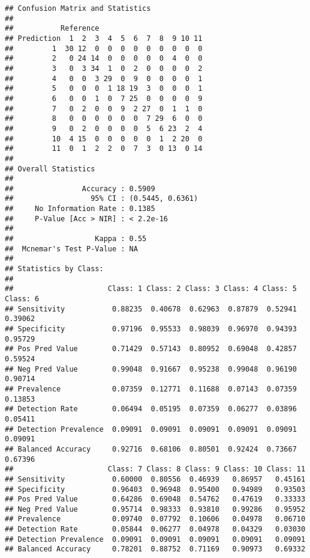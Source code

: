\documentclass[]{article}
\newenvironment{Shaded}{\begin{snugshade}}{\end{snugshade}}
\newcommand{\KeywordTok}[1]{\textcolor[rgb]{0.13,0.29,0.53}{\textbf{#1}}}
\newcommand{\DataTypeTok}[1]{\textcolor[rgb]{0.13,0.29,0.53}{#1}}
\newcommand{\CommentTok}[1]{\textcolor[rgb]{0.56,0.35,0.01}{\textit{#1}}}
\newcommand{\OtherTok}[1]{\textcolor[rgb]{0.56,0.35,0.01}{#1}}
\newcommand{\OperatorTok}[1]{\textcolor[rgb]{0.81,0.36,0.00}{\textbf{#1}}}
\newcommand{\NormalTok}[1]{#1}
\begin{document}
\begin{verbatim}
## Confusion Matrix and Statistics
## 
##           Reference
## Prediction  1  2  3  4  5  6  7  8  9 10 11
##         1  30 12  0  0  0  0  0  0  0  0  0
##         2   0 24 14  0  0  0  0  0  4  0  0
##         3   0  3 34  1  0  2  0  0  0  0  2
##         4   0  0  3 29  0  9  0  0  0  0  1
##         5   0  0  0  1 18 19  3  0  0  0  1
##         6   0  0  1  0  7 25  0  0  0  0  9
##         7   0  2  0  0  9  2 27  0  1  1  0
##         8   0  0  0  0  0  0  7 29  6  0  0
##         9   0  2  0  0  0  0  5  6 23  2  4
##         10  4 15  0  0  0  0  0  1  2 20  0
##         11  0  1  2  2  0  7  3  0 13  0 14
## 
## Overall Statistics
##                                           
##                Accuracy : 0.5909          
##                  95% CI : (0.5445, 0.6361)
##     No Information Rate : 0.1385          
##     P-Value [Acc > NIR] : < 2.2e-16       
##                                           
##                   Kappa : 0.55            
##  Mcnemar's Test P-Value : NA              
## 
## Statistics by Class:
## 
##                      Class: 1 Class: 2 Class: 3 Class: 4 Class: 5 Class: 6
## Sensitivity           0.88235  0.40678  0.62963  0.87879  0.52941  0.39062
## Specificity           0.97196  0.95533  0.98039  0.96970  0.94393  0.95729
## Pos Pred Value        0.71429  0.57143  0.80952  0.69048  0.42857  0.59524
## Neg Pred Value        0.99048  0.91667  0.95238  0.99048  0.96190  0.90714
## Prevalence            0.07359  0.12771  0.11688  0.07143  0.07359  0.13853
## Detection Rate        0.06494  0.05195  0.07359  0.06277  0.03896  0.05411
## Detection Prevalence  0.09091  0.09091  0.09091  0.09091  0.09091  0.09091
## Balanced Accuracy     0.92716  0.68106  0.80501  0.92424  0.73667  0.67396
##                      Class: 7 Class: 8 Class: 9 Class: 10 Class: 11
## Sensitivity           0.60000  0.80556  0.46939   0.86957   0.45161
## Specificity           0.96403  0.96948  0.95400   0.94989   0.93503
## Pos Pred Value        0.64286  0.69048  0.54762   0.47619   0.33333
## Neg Pred Value        0.95714  0.98333  0.93810   0.99286   0.95952
## Prevalence            0.09740  0.07792  0.10606   0.04978   0.06710
## Detection Rate        0.05844  0.06277  0.04978   0.04329   0.03030
## Detection Prevalence  0.09091  0.09091  0.09091   0.09091   0.09091
## Balanced Accuracy     0.78201  0.88752  0.71169   0.90973   0.69332
\end{verbatim}

\begin{Shaded}
\end{Shaded}
\end{document}
